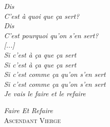 \begin{vplace}
\thispagestyle{empty}
\epigraph{
  \begin{flushright}
  \textit{
    Dis \\
    C'est à quoi que ça sert? \\
    Dis \\
    C'est pourquoi qu'on s'en sert? \\
    {[...]} \\
    Si c'est à ça que ça sert \\
    Si c'est à ça que ça sert \\
    Si c'est comme ça qu'on s'en sert \\
    Si c'est comme ça qu'on s'en sert \\
    Je vais le faire et le refaire}
  \end{flushright}}
  {\textit{Faire Et Refaire} \\
   \textsc{Ascendant Vierge}}
\end{vplace}

\cleardoublepage
